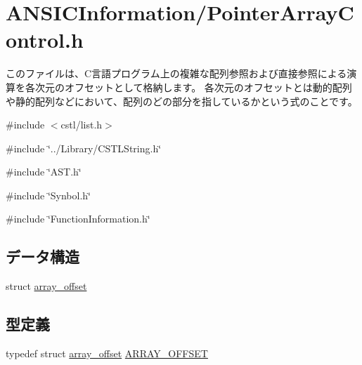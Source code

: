 \section{ANSICInformation/PointerArrayControl.h}
\label{PointerArrayControl_8h}


このファイルは、C言語プログラム上の複雑な配列参照および直接参照による演算を各次元のオフセットとして格納します。 各次元のオフセットとは動的配列や静的配列などにおいて、配列のどの部分を指しているかという式のことです。  


{\ttfamily \#include $<$cstl/list.h$>$}\par
{\ttfamily \#include \char`\"{}../Library/CSTLString.h\char`\"{}}\par
{\ttfamily \#include \char`\"{}AST.h\char`\"{}}\par
{\ttfamily \#include \char`\"{}Synbol.h\char`\"{}}\par
{\ttfamily \#include \char`\"{}FunctionInformation.h\char`\"{}}\par
\subsection*{データ構造}
\begin{DoxyCompactItemize}
\item 
struct \hyperlink{structarray__offset}{array\_\-offset}
\end{DoxyCompactItemize}
\subsection*{型定義}
\begin{DoxyCompactItemize}
\item 
typedef struct \hyperlink{structarray__offset}{array\_\-offset} \hyperlink{PointerArrayControl_8h_ae18d261788d71423fa2c0980d3de19cd}{ARRAY\_\-OFFSET}
\end{DoxyCompactItemize}
